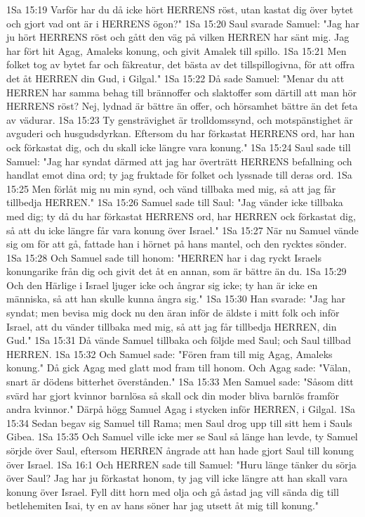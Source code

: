 1Sa 15:19  Varför har du då icke hört HERRENS röst, utan kastat dig över bytet och gjort vad ont är i HERRENS ögon?"
1Sa 15:20  Saul svarade Samuel: "Jag har ju hört HERRENS röst och gått den väg på vilken HERREN har sänt mig. Jag har fört hit Agag, Amaleks konung, och givit Amalek till spillo.
1Sa 15:21  Men folket tog av bytet far och fäkreatur, det bästa av det tillspillogivna, för att offra det åt HERREN din Gud, i Gilgal."
1Sa 15:22  Då sade Samuel: "Menar du att HERREN har samma behag till brännoffer och slaktoffer som därtill att man hör HERRENS röst? Nej, lydnad är bättre än offer, och hörsamhet bättre än det feta av vädurar.
1Sa 15:23  Ty gensträvighet är trolldomssynd, och motspänstighet är avguderi och husgudsdyrkan. Eftersom du har förkastat HERRENS ord, har han ock förkastat dig, och du skall icke längre vara konung."
1Sa 15:24  Saul sade till Samuel: "Jag har syndat därmed att jag har överträtt HERRENS befallning och handlat emot dina ord; ty jag fruktade för folket och lyssnade till deras ord.
1Sa 15:25  Men förlåt mig nu min synd, och vänd tillbaka med mig, så att jag får tillbedja HERREN."
1Sa 15:26  Samuel sade till Saul: "Jag vänder icke tillbaka med dig; ty då du har förkastat HERRENS ord, har HERREN ock förkastat dig, så att du icke längre får vara konung över Israel."
1Sa 15:27  När nu Samuel vände sig om för att gå, fattade han i hörnet på hans mantel, och den rycktes sönder.
1Sa 15:28  Och Samuel sade till honom: "HERREN har i dag ryckt Israels konungarike från dig och givit det åt en annan, som är bättre än du.
1Sa 15:29  Och den Härlige i Israel ljuger icke och ångrar sig icke; ty han är icke en människa, så att han skulle kunna ångra sig."
1Sa 15:30  Han svarade: "Jag har syndat; men bevisa mig dock nu den äran inför de äldste i mitt folk och inför Israel, att du vänder tillbaka med mig, så att jag får tillbedja HERREN, din Gud."
1Sa 15:31  Då vände Samuel tillbaka och följde med Saul; och Saul tillbad HERREN.
1Sa 15:32  Och Samuel sade: "Fören fram till mig Agag, Amaleks konung." Då gick Agag med glatt mod fram till honom. Och Agag sade: "Välan, snart är dödens bitterhet överstånden."
1Sa 15:33  Men Samuel sade: "Såsom ditt svärd har gjort kvinnor barnlösa så skall ock din moder bliva barnlös framför andra kvinnor." Därpå högg Samuel Agag i stycken inför HERREN, i Gilgal.
1Sa 15:34  Sedan begav sig Samuel till Rama; men Saul drog upp till sitt hem i Sauls Gibea.
1Sa 15:35  Och Samuel ville icke mer se Saul så länge han levde, ty Samuel sörjde över Saul, eftersom HERREN ångrade att han hade gjort Saul till konung över Israel.
1Sa 16:1  Och HERREN sade till Samuel: "Huru länge tänker du sörja över Saul? Jag har ju förkastat honom, ty jag vill icke längre att han skall vara konung över Israel. Fyll ditt horn med olja och gå åstad jag vill sända dig till betlehemiten Isai, ty en av hans söner har jag utsett åt mig till konung."

